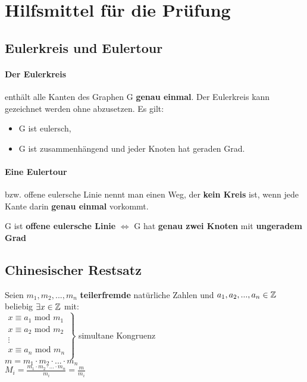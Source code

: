 \renewcommand{\ldate}{Anhang}	%

\section{Hilfsmittel für die Prüfung}
\subsection{Eulerkreis und Eulertour}
\paragraph{Der Eulerkreis} enthält alle Kanten des Graphen G \textbf{genau einmal}. Der Eulerkreis kann gezeichnet werden ohne abzusetzen. Es gilt: 
\begin{itemize}
\item G ist eulersch,
\item G ist zusammenhängend und jeder Knoten hat geraden Grad.
\end{itemize}
\paragraph{Eine Eulertour} bzw. offene eulersche Linie nennt man einen Weg, der \textbf{kein Kreis} ist, wenn jede Kante darin \textbf{genau einmal} vorkommt. 

G ist \textbf{offene eulersche Linie} $\Leftrightarrow$ G hat \textbf{genau zwei Knoten} mit \textbf{ungeradem Grad}

\subsection{Chinesischer Restsatz} 
Seien $m_1, m_2, ..., m_n$  \textbf{teilerfremde} natürliche Zahlen und $a_1, a_2, ..., a_n \in \mathbb{Z}$ beliebig $\exists x\in \mathbb{Z}$ mit: \\

$
\left.
\begin{matrix}
x\equiv a_1 \textrm{ mod } m_1\\
x\equiv a_2 \textrm{ mod } m_2\\
\vdots\\
x\equiv a_n \textrm{ mod } m_n\\
\end{matrix}
\right\rbrace
$ simultane Kongruenz\\

$m=m_1\cdot m_2\cdot ...\cdot m_n$\\
$M_i=\frac{m_1\cdot m_2\cdot ...\cdot m_n}{m_i}=\frac{m}{m_i}$\\

